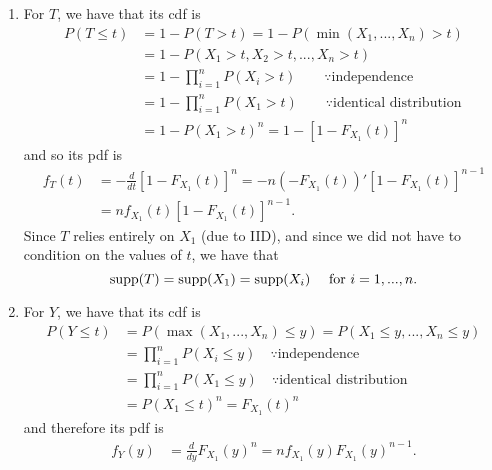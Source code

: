 \documentclass[notoc,notitlepage]{tufte-book}
\begin{document}
\begin{solution}
  \begin{enumerate}
    \item For $T$, we have that its cdf is
      \begin{align*}
        P(T \leq t) &= 1 - P(T > t) = 1 - P( \min(X_1, ..., X_n) > t ) \\
                    &= 1 - P( X_1 > t, X_2 > t, ..., X_n > t ) \\
                    &= 1 - \prod_{i=1}^{n} P(X_i > t) \qquad \because \text{independence} \\
                    &= 1 - \prod_{i=1}^{n} P(X_1 > t) \qquad \because \text{identical distribution} \\
                    &= 1 - P(X_1 > t)^n = 1 - [ 1 - F_{X_1}(t) ]^n
      \end{align*}
      and so its pdf is
      \begin{align*}
        f_T(t) &= - \frac{d}{dt} [ 1 - F_{X_1}(t) ]^n = -n ( -F_{X_1}(t) )' [ 1 - F_{X_1}(t) ]^{n - 1} \\
               &= n f_{X_1}(t) [ 1 - F_{X_1}(t) ]^{n - 1}.
      \end{align*}
      Since $T$ relies entirely on $X_1$ (due to IID), and since we did not have to condition on the values of $t$, we have that
      \begin{equation*}
        \operatorname{supp}(T) = \operatorname{supp}(X_1) = \operatorname{supp}(X_i) \quad \text{ for } i = 1, ..., n.
      \end{equation*}

    \item For $Y$, we have that its cdf is
      \begin{align*}
        P(Y \leq t) &= P( \max(X_1, ..., X_n) \leq y) = P(X_1 \leq y, ..., X_n \leq y) \\
                    &= \prod_{i=1}^{n} P(X_i \leq y) \quad \because \text{independence} \\
                    &= \prod_{i=1}^{n} P(X_1 \leq y) \quad \because \text{identical distribution} \\
                    &= P(X_1 \leq t)^n = F_{X_1}(t)^n
      \end{align*}
      and therefore its pdf is
      \begin{align*}
        f_Y(y) &= \frac{d}{dy} F_{X_1}(y)^n = n f_{X_1}(y) F_{X_1}(y)^{n - 1}.
      \end{align*}
  \end{enumerate}
\end{solution}
\end{document}
